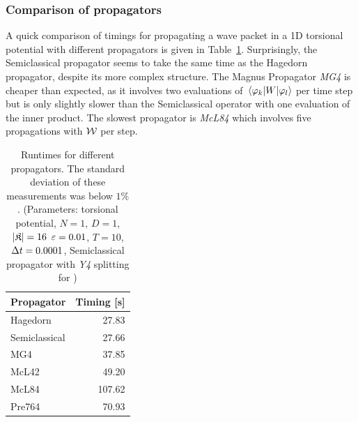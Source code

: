 \subsubsection{Comparison of propagators}
%
A quick comparison of timings for propagating a wave packet in a 1D torsional potential with different propagators is given in Table~\ref{tab:comparison}.
Surprisingly, the Semiclassical propagator seems to take the same time as the Hagedorn propagator, despite its more complex structure.
The Magnus Propagator \emph{MG4} is cheaper than expected, as it involves two evaluations of $\matrixel{\varphi_k}{W}{\varphi_l}$ per time step but is only slightly slower than the Semiclassical operator with one evaluation of the inner product.
The slowest propagator is \emph{McL84} which involves five propagations with $\mathcal{W}$ per step.
%
\begin{table}[ht]
	\centering
	\begin{tabular}{|l | r |} 
		\hline
		\multicolumn{1}{|c}{\textbf{Propagator}} &
		\multicolumn{1}{|c|}{\textbf{Timing [s]}} \\
		\hline
		Hagedorn & 27.83 \\
		Semiclassical & 27.66 \\
		MG4 & 37.85 \\
		McL42 & 49.20 \\
		McL84 & 107.62 \\
		Pre764 & 70.93 \\
		\hline
	\end{tabular}
	\caption{Runtimes for different propagators. The standard deviation of these measurements was below $1\%$.
	(Parameters: torsional potential, $N=1$, $D=1$, $|\mathfrak{K}|=16$ $\varepsilon=0.01$, $T=10$, $\Delta t=0.0001$, Semiclassical propagator with \emph{Y4} splitting for ) }
	\label{tab:comparison}
\end{table}


